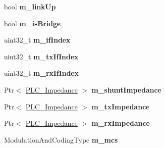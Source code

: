 \begin{DoxyCompactItemize}
\item 
\hypertarget{classns3_1_1PLC__NetDevice_add8c8bcfc2470e991bcc72e0062b75fd}{bool {\bfseries m\-\_\-link\-Up}}\label{classns3_1_1PLC__NetDevice_add8c8bcfc2470e991bcc72e0062b75fd}

\item 
\hypertarget{classns3_1_1PLC__NetDevice_a9eb297563674f4e0a7fa3d9dab3b7780}{bool {\bfseries m\-\_\-is\-Bridge}}\label{classns3_1_1PLC__NetDevice_a9eb297563674f4e0a7fa3d9dab3b7780}

\item 
\hypertarget{classns3_1_1PLC__NetDevice_ae54c6abd79f1ee7d01a398b40c67c166}{uint32\-\_\-t {\bfseries m\-\_\-if\-Index}}\label{classns3_1_1PLC__NetDevice_ae54c6abd79f1ee7d01a398b40c67c166}

\item 
\hypertarget{classns3_1_1PLC__NetDevice_a79795d35166a47eb3cfb66ef4e3fb23d}{uint32\-\_\-t {\bfseries m\-\_\-tx\-If\-Index}}\label{classns3_1_1PLC__NetDevice_a79795d35166a47eb3cfb66ef4e3fb23d}

\item 
\hypertarget{classns3_1_1PLC__NetDevice_ac672e6c848c42b442a1305ce81d97b22}{uint32\-\_\-t {\bfseries m\-\_\-rx\-If\-Index}}\label{classns3_1_1PLC__NetDevice_ac672e6c848c42b442a1305ce81d97b22}

\item 
\hypertarget{classns3_1_1PLC__NetDevice_a13a830a72f54029a291a878d2c6e5b17}{\-Ptr$<$ \hyperlink{classns3_1_1PLC__ValueBase}{\-P\-L\-C\-\_\-\-Impedance} $>$ {\bfseries m\-\_\-shunt\-Impedance}}\label{classns3_1_1PLC__NetDevice_a13a830a72f54029a291a878d2c6e5b17}

\item 
\hypertarget{classns3_1_1PLC__NetDevice_a5f5940db4b3fb53bea1b789915ab467e}{\-Ptr$<$ \hyperlink{classns3_1_1PLC__ValueBase}{\-P\-L\-C\-\_\-\-Impedance} $>$ {\bfseries m\-\_\-tx\-Impedance}}\label{classns3_1_1PLC__NetDevice_a5f5940db4b3fb53bea1b789915ab467e}

\item 
\hypertarget{classns3_1_1PLC__NetDevice_a6426a2401946a2f7d89701c9f34f4266}{\-Ptr$<$ \hyperlink{classns3_1_1PLC__ValueBase}{\-P\-L\-C\-\_\-\-Impedance} $>$ {\bfseries m\-\_\-rx\-Impedance}}\label{classns3_1_1PLC__NetDevice_a6426a2401946a2f7d89701c9f34f4266}

\item 
\hypertarget{classns3_1_1PLC__NetDevice_afcfc1d9a7624cba1c310701e03ff3f8c}{\-Modulation\-And\-Coding\-Type {\bfseries m\-\_\-mcs}}\label{classns3_1_1PLC__NetDevice_afcfc1d9a7624cba1c310701e03ff3f8c}


\end{DoxyCompactItemize}
